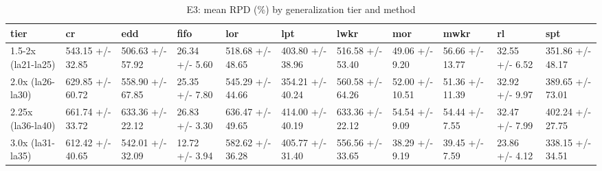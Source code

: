 \begin{table}[htbp]
\centering
\caption{E3: mean RPD (\%) by generalization tier and method}
\label{tab:ch6-e3-rpd-summary}
\begin{tabular}{lllllllllll}
\toprule
tier & cr & edd & fifo & lor & lpt & lwkr & mor & mwkr & rl & spt \\
\midrule
1.5-2x (la21-la25) & 543.15 +/- 32.85 & 506.63 +/- 57.92 & 26.34 +/- 5.60 & 518.68 +/- 48.65 & 403.80 +/- 38.96 & 516.58 +/- 53.40 & 49.06 +/- 9.20 & 56.66 +/- 13.77 & 32.55 +/- 6.52 & 351.86 +/- 48.17 \\
2.0x (la26-la30) & 629.85 +/- 60.72 & 558.90 +/- 67.85 & 25.35 +/- 7.80 & 545.29 +/- 44.66 & 354.21 +/- 40.24 & 560.58 +/- 64.26 & 52.00 +/- 10.51 & 51.36 +/- 11.39 & 32.92 +/- 9.97 & 389.65 +/- 73.01 \\
2.25x (la36-la40) & 661.74 +/- 33.72 & 633.36 +/- 22.12 & 26.83 +/- 3.30 & 636.47 +/- 49.65 & 414.00 +/- 40.19 & 633.36 +/- 22.12 & 54.54 +/- 9.09 & 54.44 +/- 7.55 & 32.47 +/- 7.99 & 402.24 +/- 27.75 \\
3.0x (la31-la35) & 612.42 +/- 40.65 & 542.01 +/- 32.09 & 12.72 +/- 3.94 & 582.62 +/- 36.28 & 405.77 +/- 31.40 & 556.56 +/- 33.65 & 38.29 +/- 9.19 & 39.45 +/- 7.59 & 23.86 +/- 4.12 & 338.15 +/- 34.51 \\
\bottomrule
\end{tabular}
\end{table}
